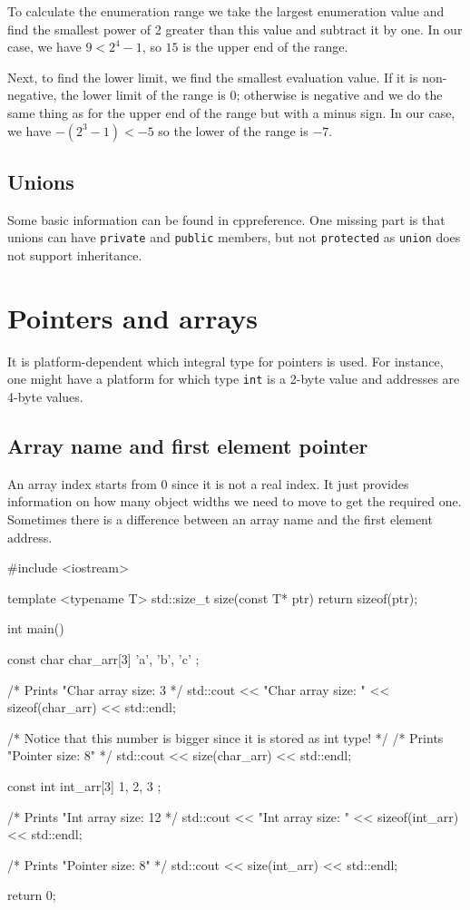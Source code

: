 \documentclass[../main]{subfiles}
\begin{document}
    To calculate the enumeration range we take the largest enumeration value and find the smallest power of 2 greater than this value and subtract it by one.
In our case, we have $9 < 2^4-1$, so $15$ is the upper end of the range.\newline

    Next, to find the lower limit, we find the smallest evaluation value. If it is non-negative, the lower limit of the range is $0$;
otherwise is negative and we do the same thing as for the upper end of the range but with a minus sign. In our case, we have $-(2^3-1) < -5$ so the lower of the range is $-7$.

\subsection{Unions}
    Some basic information can be found in cppreference. One missing part is that unions can have \texttt{private} and \texttt{public} members, but not \texttt{protected}
as \texttt{union} does not support inheritance.

\section{Pointers and arrays}
    It is platform-dependent which integral type for pointers is used. For instance, one might have a platform for which type \texttt{int} is a 2-byte value and addresses are 4-byte values.

\subsection{Array name and first element pointer}
    An array index starts from 0 since it is not a real index. It just provides information on how many object widths we need to move to get the required one.
Sometimes there is a difference between an array name and the first element address.
\begin{Code}
    #include <iostream>
    
    template <typename T>
    std::size_t size(const T* ptr)
    {
        return sizeof(ptr);
    }
    
    int main()
    {
        const char char_arr[3] { 'a', 'b', 'c' };
        
        /* Prints "Char array size: 3 */
        std::cout << "Char array size: " << sizeof(char_arr) << std::endl;
        
        /* Notice that this number is bigger since it is stored as int type! */
        /* Prints "Pointer size: 8" */
        std::cout << size(char_arr) << std::endl;
        
        const int int_arr[3] { 1, 2, 3 };
        
        /* Prints "Int array size: 12 */
        std::cout << "Int array size: " << sizeof(int_arr) << std::endl;
        
        /* Prints "Pointer size: 8" */
        std::cout << size(int_arr) << std::endl;
    
        return 0;
    }
\end{Code}
\end{document}
